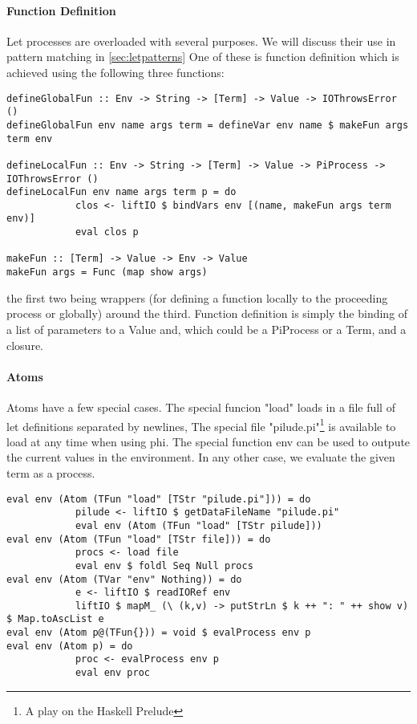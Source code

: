 \paragraph{Function Definition}
Let processes are overloaded with several purposes. We will discuss their use in pattern matching in \ref{sec:letpatterns} One of these is function definition which is achieved using the following three functions:
\begin{verbatim}
defineGlobalFun :: Env -> String -> [Term] -> Value -> IOThrowsError ()
defineGlobalFun env name args term = defineVar env name $ makeFun args term env

defineLocalFun :: Env -> String -> [Term] -> Value -> PiProcess -> IOThrowsError ()
defineLocalFun env name args term p = do
            clos <- liftIO $ bindVars env [(name, makeFun args term env)]
            eval clos p

makeFun :: [Term] -> Value -> Env -> Value
makeFun args = Func (map show args)
\end{verbatim}
the first two being wrappers (for defining a function locally to the proceeding process or globally) around the third. Function definition is simply the binding of a list of parameters to a Value and, which could be a PiProcess or a Term, and a closure.

\paragraph{Atoms}
Atoms have a few special cases. The special funcion "load" loads in a file full of let definitions separated by newlines,
The special file "pilude.pi"\footnote{A play on the Haskell Prelude} is available to load at any time when using phi. The special function env can be used to outpute the current values in the environment. In any other case, we evaluate the given term as a process.
\begin{verbatim}
eval env (Atom (TFun "load" [TStr "pilude.pi"])) = do
            pilude <- liftIO $ getDataFileName "pilude.pi"
            eval env (Atom (TFun "load" [TStr pilude]))
eval env (Atom (TFun "load" [TStr file])) = do
            procs <- load file  
            eval env $ foldl Seq Null procs
eval env (Atom (TVar "env" Nothing)) = do
            e <- liftIO $ readIORef env
            liftIO $ mapM_ (\ (k,v) -> putStrLn $ k ++ ": " ++ show v) $ Map.toAscList e
eval env (Atom p@(TFun{})) = void $ evalProcess env p
eval env (Atom p) = do
            proc <- evalProcess env p
            eval env proc
\end{verbatim}
